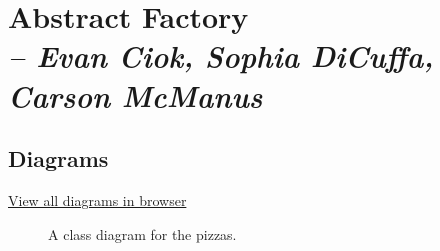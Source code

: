 \chapter{Abstract Factory \\
  \small{\textit{-- Evan Ciok, Sophia DiCuffa, Carson McManus}}
  \label{Chapter::AbstractFactory}}

\section{Diagrams}

\href{https://github.com/dyc3/ssw345-group-assignments/blob/main/Figures/abstractFactory/figures-source.md}{View all diagrams in browser}

\begin{figure}[htb]
  \centering
  \caption{\label{Figure::pizzadiagram} A class diagram for the pizzas.}
\end{figure}

